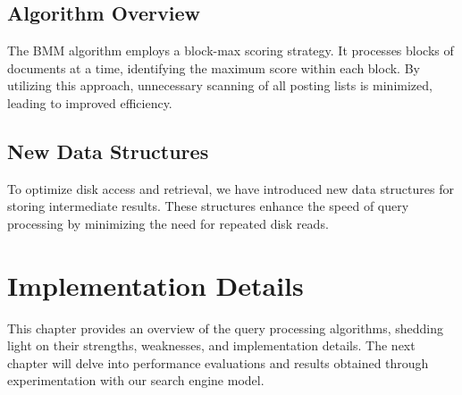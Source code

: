 \subsection{Algorithm Overview}

The BMM algorithm employs a block-max scoring strategy. It processes blocks of documents at a time, identifying the maximum 
score within each block. By utilizing this approach, unnecessary scanning of all posting lists is minimized, leading to 
improved efficiency.

\subsection{New Data Structures}

To optimize disk access and retrieval, we have introduced new data structures for storing intermediate results. These 
structures enhance the speed of query processing by minimizing the need for repeated disk reads.

\section{Implementation Details}



This chapter provides an overview of the query processing algorithms, shedding light on their strengths, weaknesses, and 
implementation details. The next chapter will delve into performance evaluations and results obtained through experimentation 
with our search engine model.
